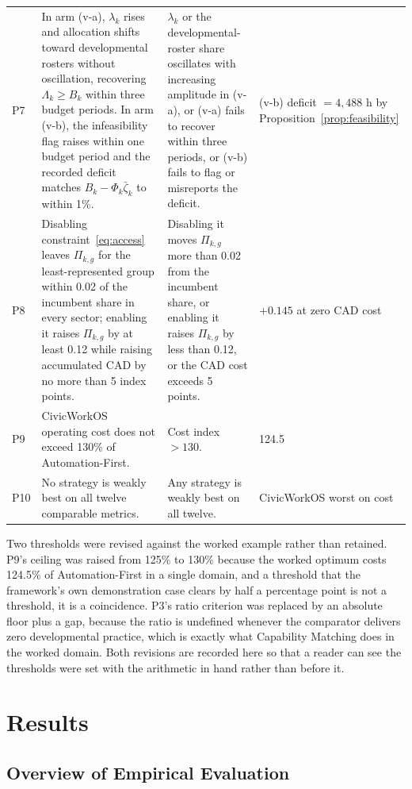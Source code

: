 \begin{table}[!htbp]
\begin{tabularx}{\textwidth}{@{}p{0.5cm}XXp{1.9cm}@{}}
			P7 & In arm (v-a), $\lambda_k$ rises and allocation shifts toward developmental rosters without oscillation, recovering $\Lambda_k \geq B_k$ within three budget periods. In arm (v-b), the infeasibility flag raises within one budget period and the recorded deficit matches $B_k - \Phi_k\bar\zeta_k$ to within 1\%. & $\lambda_k$ or the developmental-roster share oscillates with increasing amplitude in (v-a), or (v-a) fails to recover within three periods, or (v-b) fails to flag or misreports the deficit. & (v-b) deficit $=4{,}488$ h by Proposition~\ref{prop:feasibility}\\
			P8 & Disabling constraint~\eqref{eq:access} leaves $\Pi_{k,g}$ for the least-represented group within 0.02 of the incumbent share in every sector; enabling it raises $\Pi_{k,g}$ by at least 0.12 while raising accumulated CAD by no more than 5 index points. & Disabling it moves $\Pi_{k,g}$ more than 0.02 from the incumbent share, or enabling it raises $\Pi_{k,g}$ by less than 0.12, or the CAD cost exceeds 5 points. & $+0.145$ at zero CAD cost\\
			P9 & CivicWorkOS operating cost does not exceed 130\% of Automation-First. & Cost index $> 130$. & 124.5\\
			P10 & No strategy is weakly best on all twelve comparable metrics. & Any strategy is weakly best on all twelve. & CivicWorkOS worst on cost\\
			\bottomrule
		\end{tabularx}
	\end{table}
	
	Two thresholds were revised against the worked example rather than retained. P9's ceiling was raised from 125\% to 130\% because the worked optimum costs 124.5\% of Automation-First in a single domain, and a threshold that the framework's own demonstration case clears by half a percentage point is not a threshold, it is a coincidence. P3's ratio criterion was replaced by an absolute floor plus a gap, because the ratio is undefined whenever the comparator delivers zero developmental practice, which is exactly what Capability Matching does in the worked domain. Both revisions are recorded here so that a reader can see the thresholds were set with the arithmetic in hand rather than before it.
	
	\section{Results}
	\label{sec:results}
	
	\subsection{Overview of Empirical Evaluation}
	\label{sec:status}
	
